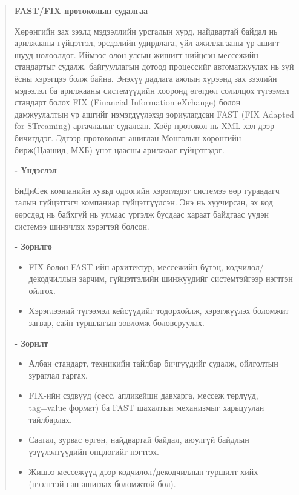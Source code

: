 
\fontsize{10pt}{12pt}\selectfont
\begin{abstract}
    \large{\textbf{FAST/FIX протоколын судалгаа}} \par
        Хөрөнгийн зах зээлд мэдээллийн урсгалын хурд, найдвартай байдал нь арилжааны гүйцэтгэл, эрсдэлийн удирдлага, үйл ажиллагааны үр ашигт шууд нөлөөлдөг. Иймээс олон улсын жишигт нийцсэн мессежийн стандартыг судалж, байгууллагын дотоод процессийг автоматжуулах нь зүй ёсны хэрэгцээ болж байна. Энэхүү дадлага ажлын хүрээнд зах зээлийн мэдээлэл ба арилжааны системүүдийн хооронд өгөгдөл солилцох түгээмэл стандарт болох FIX (Financial Information eXchange) болон дамжуулалтын үр ашгийг нэмэгдүүлэхэд зориулагдсан FAST (FIX Adapted for STreaming) аргачлалыг судалсан. Хоёр протокол нь XML хэл дээр бичигддэг. Эдгээр протоколыг ашиглан Монголын хөрөнгийн бирж(Цаашид, МХБ) үнэт цаасны арилжааг гүйцэтгэдэг.\par
  \textbf{- Үндэслэл} \par
    БиДиСек компанийн хувьд одоогийн хэрэглэдэг системээ өөр гуравдагч талын гүйцэтгэгч компаниар гүйцэтгүүлсэн. Энэ нь хуучирсан, эх код өөрсдөд нь байхгүй нь улмаас үргэлж бусдаас хараат байдгаас үүдэн системээ шинэчлэх хэрэгтэй болсон.
    \par
  \textbf{- Зорилго}
  \begin{itemize}
      \item FIX болон FAST-ийн архитектур, мессежийн бүтэц, кодчилол/декодчиллын зарчим, гүйцэтгэлийн шинжүүдийг системтэйгээр нэгтгэн ойлгох.
      \item Хэрэглээний түгээмэл кейсүүдийг тодорхойлж, хэрэгжүүлэх боломжит загвар, сайн туршлагын зөвлөмж боловсруулах.
  \end{itemize}
  
  \textbf{- Зорилт}
    \begin{itemize}
        \item Албан стандарт, техникийн тайлбар бичгүүдийг судалж, ойлголтын зураглал гаргах.
        \item FIX-ийн сэдвүүд (сесс, апликейшн давхарга, мессеж төрлүүд, tag=value формат) ба FAST шахалтын механизмыг харьцуулан тайлбарлах.
        \item Саатал, зурвас өргөн, найдвартай байдал, аюулгүй байдлын үзүүлэлтүүдийн онцлогийг нэгтгэх.
        \item Жишээ мессежүүд дээр кодчилол/декодчиллын туршилт хийх (нээлттэй сан ашиглах боломжтой бол).
    \end{itemize}


\end{abstract}
